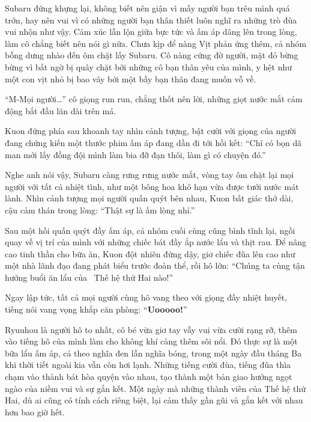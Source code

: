 \documentclass[../main.tex]{subfiles}
\begin{document}
Subaru đứng khựng lại, không biết nên giận vì mấy người bạn trêu mình quá trớn, hay nên vui vì có những người bạn thân thiết luôn nghĩ ra những trò đùa vui nhộn như vậy. Cảm xúc lẫn lộn giữa bực tức và ấm áp dâng lên trong lòng, làm cô chẳng biết nên nói gì nữa. Chưa kịp để nàng Vịt phản ứng thêm, cả nhóm bỗng dưng nhào đến ôm chặt lấy Subaru. Cô nàng cứng đờ người, mặt đỏ bừng bừng vì bất ngờ bị quây chặt bởi những cô bạn thân yêu của mình, y hệt như một con vịt nhỏ bị bao vây bởi một bầy bạn thân đang muốn vỗ về.

``M-Mọi người\dots'' cô giọng run run, chẳng thốt nên lời, những giọt nước mắt cảm động bắt đầu lăn dài trên má.

Kuon đứng phía sau khoanh tay nhìn cảnh tượng, bật cười với giọng của người đang chứng kiến một thước phim ấm áp đang dần đi tới hồi kết: ``Chỉ có bọn dã man mới lấy đồng đội mình làm bia đỡ đạn thôi, làm gì có chuyện đó.''

Nghe anh nói vậy, Subaru càng rưng rưng nước mắt, vòng tay ôm chặt lại mọi người với tất cả nhiệt tình, như một bông hoa khô hạn vừa được tưới nước mát lành. Nhìn cảnh tượng mọi người quấn quýt bên nhau, Kuon bất giác thở dài, cậu cảm thán trong lòng: ``Thật sự là ấm lòng nhỉ.''

\ct

Sau một hồi quấn quýt đầy ấm áp, cả nhóm cuối cùng cũng bình tĩnh lại, ngồi quay về vị trí của mình với những chiếc bát đầy ắp nước lẩu và thịt rau. Để nâng cao tinh thần cho bữa ăn, Kuon đột nhiên đứng dậy, giơ chiếc đũa lên cao như một nhà lãnh đạo đang phát biểu trước đoàn thể, rồi hô lớn: ``Chúng ta cùng tận hưởng buổi ăn lẩu của \hll\ Thế hệ thứ Hai nào!''

Ngay lập tức, tất cả mọi người cùng hô vang theo với giọng đầy nhiệt huyết, tiếng nói vang vọng khắp căn phòng: ``\textbf{Uooooo!}''

Ryuuhou là người hô to nhất, cô bé vừa giơ tay vẫy vui vừa cười rạng rỡ, thêm vào tiếng hô của mình làm cho không khí càng thêm sôi nổi. Đó thực sự là một bữa lẩu ấm áp, cả theo nghĩa đen lẫn nghĩa bóng, trong một ngày đầu tháng Ba khi thời tiết ngoài kia vẫn còn hơi lạnh. Những tiếng cười đùa, tiếng đũa thìa chạm vào thành bát hòa quyện vào nhau, tạo thành một bản giao hưởng ngọt ngào của niềm vui và sự gắn kết. Một ngày mà những thành viên của Thế hệ thứ Hai, dù ai cũng có tính cách riêng biệt, lại cảm thấy gần gũi và gắn kết với nhau hơn bao giờ hết.
\end{document}

